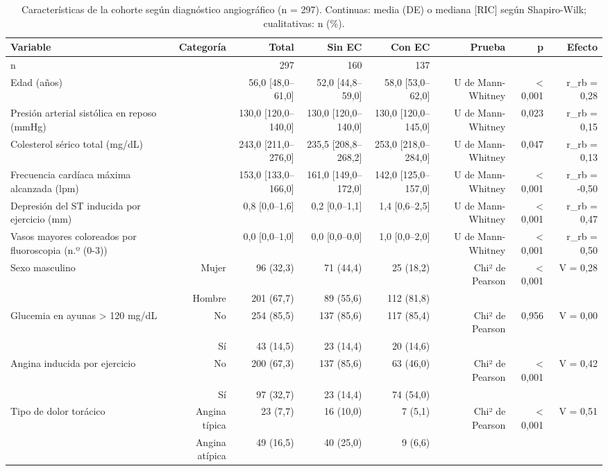 \begin{table}[H]
\caption{Características de la cohorte según diagnóstico angiográfico (n = 297). Continuas: media (DE) o mediana [RIC] según Shapiro-Wilk; cualitativas: n (\%).}
\label{tab:tabla1}
\begin{tabular}{lrrrrrrr}
\toprule
Variable & Categoría & Total & Sin EC & Con EC & Prueba & p & Efecto \\
\midrule
n &  & 297 & 160 & 137 &  &  &  \\
Edad (años) &  & 56,0 [48,0–61,0] & 52,0 [44,8–59,0] & 58,0 [53,0–62,0] & U de Mann-Whitney & < 0,001 & r\_rb = 0,28 \\
Presión arterial sistólica en reposo (mmHg) &  & 130,0 [120,0–140,0] & 130,0 [120,0–140,0] & 130,0 [120,0–145,0] & U de Mann-Whitney & 0,023 & r\_rb = 0,15 \\
Colesterol sérico total (mg/dL) &  & 243,0 [211,0–276,0] & 235,5 [208,8–268,2] & 253,0 [218,0–284,0] & U de Mann-Whitney & 0,047 & r\_rb = 0,13 \\
Frecuencia cardíaca máxima alcanzada (lpm) &  & 153,0 [133,0–166,0] & 161,0 [149,0–172,0] & 142,0 [125,0–157,0] & U de Mann-Whitney & < 0,001 & r\_rb = -0,50 \\
Depresión del ST inducida por ejercicio (mm) &  & 0,8 [0,0–1,6] & 0,2 [0,0–1,1] & 1,4 [0,6–2,5] & U de Mann-Whitney & < 0,001 & r\_rb = 0,47 \\
Vasos mayores coloreados por fluoroscopia (n.º (0-3)) &  & 0,0 [0,0–1,0] & 0,0 [0,0–0,0] & 1,0 [0,0–2,0] & U de Mann-Whitney & < 0,001 & r\_rb = 0,50 \\
Sexo masculino & Mujer & 96 (32,3) & 71 (44,4) & 25 (18,2) & Chi² de Pearson & < 0,001 & V = 0,28 \\
 & Hombre & 201 (67,7) & 89 (55,6) & 112 (81,8) &  &  &  \\
Glucemia en ayunas > 120 mg/dL & No & 254 (85,5) & 137 (85,6) & 117 (85,4) & Chi² de Pearson & 0,956 & V = 0,00 \\
 & Sí & 43 (14,5) & 23 (14,4) & 20 (14,6) &  &  &  \\
Angina inducida por ejercicio & No & 200 (67,3) & 137 (85,6) & 63 (46,0) & Chi² de Pearson & < 0,001 & V = 0,42 \\
 & Sí & 97 (32,7) & 23 (14,4) & 74 (54,0) &  &  &  \\
Tipo de dolor torácico & Angina típica & 23 (7,7) & 16 (10,0) & 7 (5,1) & Chi² de Pearson & < 0,001 & V = 0,51 \\
 & Angina atípica & 49 (16,5) & 40 (25,0) & 9 (6,6) &  &  &  \\

\end{tabular}
\end{table}
